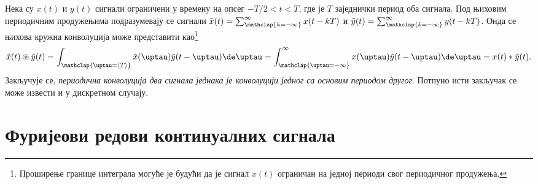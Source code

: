 Нека су $x(t)$ и $y(t)$ сигнали ограничени у времену на опсег $-T/2 < t < T$, где је $T$ заједнички период оба сигнала. 
Под њиховим периодичним продужењима подразумевају се сигнали
$\tilde{x}(t) = \sum_{\mathclap{k = -\infty}}^{\infty} x(t - kT)$ и 
$\tilde y(t) =  \sum_{\mathclap{k = -\infty}}^{\infty} y(t - kT)$. Онда се њихова кружна конволуција може представити 
као\footnote{Проширење границе интеграла могуће је будући да је сигнал $x(t)$ ограничан на једној периоди свог 
периодичног продужења.}
\begin{equation}
    \tilde x(t) \circledast \tilde y(t) = \int_{\mathclap{\uptau = \langle T \rangle }} \tilde x(\uptau) \tilde y(t-\uptau) \de \uptau
    = \int_{\mathclap{\uptau =-\infty}}^{\infty} x(\uptau) \tilde y(t-\uptau) \de \uptau = x(t) \ast \tilde y(t). 
\end{equation}
Закључује се, \textit{периодична конволуција два сигнала једнака је конволуцији једног са основим периодом другог}.
Потпуно исти закључак се може извести и у дискретном случају. 

\section*{Фуријеови редови континуалних сигнала} \label{d:CTFS}

